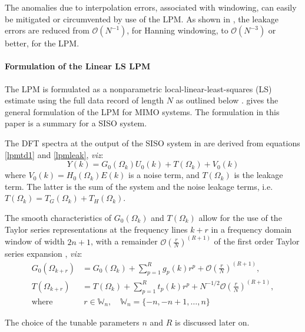 The anomalies due to interpolation errors, associated with windowing, can easily be mitigated or circumvented by use of the LPM. As shown in \citep{Pintelon2012}, the leakage errors are reduced from  $\mathcal{O}({N}^{-1})$, for Hanning windowing, to $\mathcal{O}({N}^{-3})$ or better, for the LPM.


\paragraph{Formulation of the Linear LS LPM}
The LPM is formulated as a nonparametric local-linear-least-squares (LS) estimate using the full data record of length $N$ as outlined below \citep{schoukens2010nonparametric}. 
\citet[Section 7.2.2]{Pintelon2012} gives the general formulation of the \gls{LPM} for \gls{MIMO} systems. 
The formulation in this paper is a summary for a \gls{SISO} system.

The \gls{DFT} spectra at the output of the \gls{SISO} system in  are derived from equations \eqref{lpmtd1} and \eqref{lpmleak}, \emph{viz}:
\begin{equation}\label{lpm1spectra}
Y(k)=G_0(\Omega_k)U_0(k)+T(\Omega_k)+V_0(k)
\end{equation}
where $V_0(k) = H_0(\Omega_k)E(k)$ is a noise term, and $T(\Omega_k)$ is the leakage term. The latter is the sum of the system and the noise leakage terms, i.e. $T(\Omega_k) = T_G(\Omega_k) + T_H(\Omega_k)$.

The smooth characteristics of $G_0(\Omega_k)$ and $T(\Omega_k)$ allow for the use of the Taylor series representations at the frequency lines $k+r$ in a frequency domain window of width $2n+1$, with a remainder $\mathcal{O}\left(\frac{r}{N}\right)^{(R+1)}$ of the first order Taylor series expansion \citep{schoukens2010nonparametric}, \emph{viz}:
\begin{align}\label{lpmGTaylorS}
G_0(\Omega_{k+r})&=G_0(\Omega_k)+\sum_{p=1}^{R}g_p(k)r^p+\mathcal{O}\left(\frac{r}{N}\right)^{(R+1)},
\\
\label{lpmTTaylorS}
T(\Omega_{k+r})&=T(\Omega_k)+\sum_{p=1}^{R}t_p(k)r^p+N^{-1/2}\mathcal{O}\left(\frac{r}{N}\right)^{(R+1)},
\\
\text{where}&\ r\in\mathbb{W}_n,\quad \mathbb{W}_n = \{-n,-n+1,\dots,n\}
\end{align}

The choice of the tunable parameters $n$ and $R$ is discussed later on.


